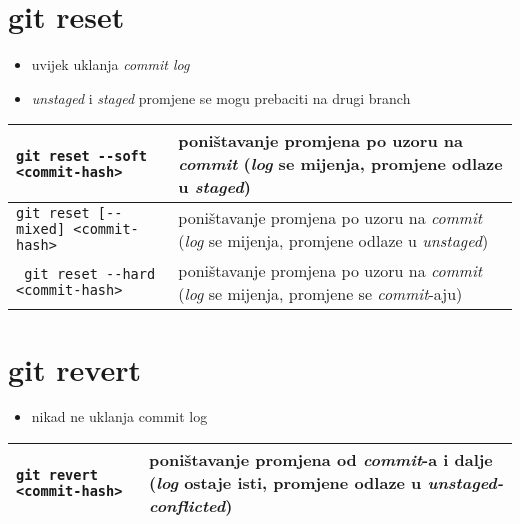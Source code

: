\documentclass[10pt]{article}
\begin{document}
    \section*{git reset}
    \begin{itemize}
        \item uvijek uklanja \textit{commit log}
        \item \textit{unstaged} i \textit{staged} promjene se mogu prebaciti na drugi branch
    \end{itemize}
    \begin{tabular}{|>{\tt}p{9.00cm}|>{}p{15.50cm}|}
        \hline
        git reset -{}-soft <commit-hash>                  & poništavanje promjena po uzoru na \textit{commit} (\textit{log} se mijenja, promjene odlaze u \textit{staged}) \\ \hline
        git reset [-{}-mixed] <commit-hash>               & poništavanje promjena po uzoru na \textit{commit} (\textit{log} se mijenja, promjene odlaze u \textit{unstaged}) \\ \hline
        git reset -{}-hard <commit-hash>                  & poništavanje promjena po uzoru na \textit{commit} (\textit{log} se mijenja, promjene se \textit{commit}-aju) \\ \hline
    \end{tabular}

    \section*{git revert}
    \begin{itemize}
        \item nikad ne uklanja commit log
    \end{itemize}
    \begin{tabular}{|>{\tt}p{9.00cm}|>{}p{15.50cm}|}
        \hline
        git revert <commit-hash>                        & poništavanje promjena od \textit{commit}-a i dalje (\textit{log} ostaje isti, promjene odlaze u \textit{unstaged-conflicted}) \\ \hline
    \end{tabular}
\end{document}
